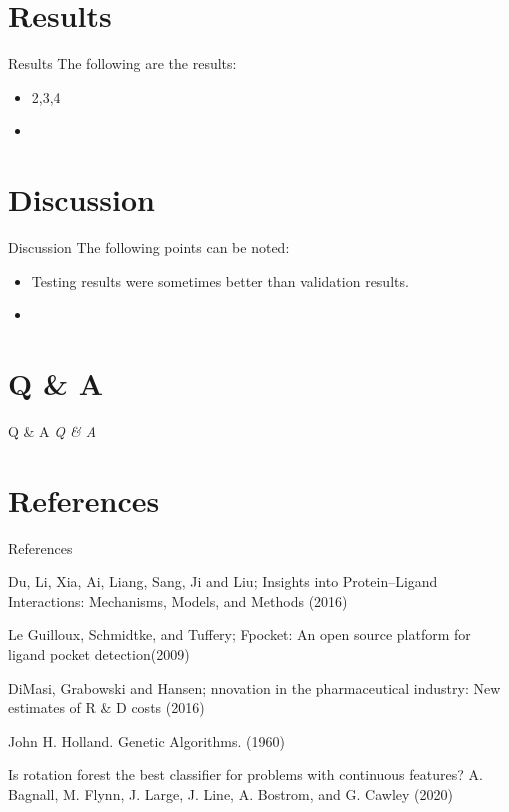\documentclass{beamer}
\begin{document}
\section{Results}
\begin{frame}[t]{Results}
The following are the results:
\begin{itemize}
\item 2,3,4
\item
\end{itemize} 
\end{frame}

\section{Discussion}
\begin{frame}[t]{Discussion}
The following points can be noted:
\begin{itemize}
\item Testing results were sometimes better than validation results.
\item
\end{itemize} 
\end{frame}

\section{Q \& A}

\begin{frame}[t]{Q \& A}
  \centering \Huge
  \emph{Q \& A}
\end{frame}

\section{References}

\begin{frame}[t]{References}

\begin{thebibliography}{1}

\alert{Du,  Li,  Xia,  Ai,  Liang,  Sang,  Ji and Liu; Insights into Protein–Ligand Interactions: Mechanisms, Models, and Methods (2016)}

\alert{Le Guilloux,  Schmidtke, and Tuffery; Fpocket: An open source platform for ligand pocket detection(2009)}

\alert{DiMasi,  Grabowski and Hansen; nnovation in the pharmaceutical industry: New estimates of R \& D costs (2016)}

\alert{John H. Holland.  Genetic Algorithms. (1960)}

\alert{Is rotation forest the best classifier for problems with continuous features? A. Bagnall, M. Flynn, J. Large, J. Line, A. Bostrom, and G. Cawley (2020)}

\end{thebibliography}

\end{frame}
\end{document}
